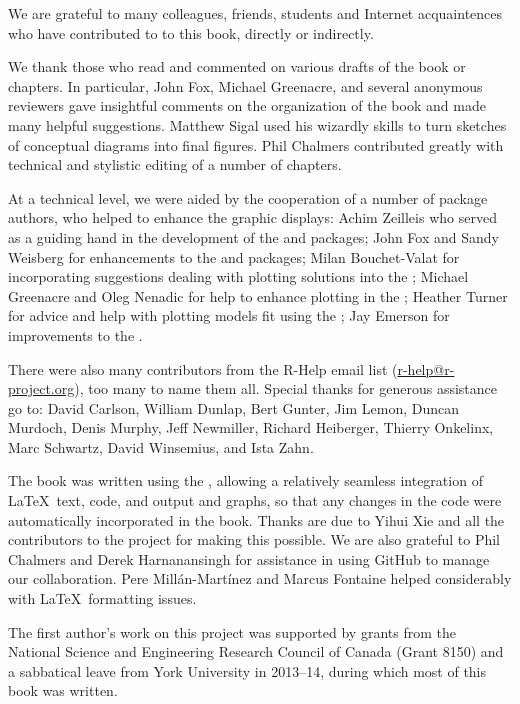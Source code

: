 We are grateful to many colleagues, friends, students and Internet acquaintences who have contributed to
to this book, directly or indirectly.

We thank those who read and commented on various drafts of the book or chapters.
In particular, John Fox, Michael Greenacre, and several anonymous reviewers gave
insightful comments on the organization of the book and made many helpful suggestions.
Matthew Sigal used his wizardly skills to turn sketches of conceptual diagrams into
final figures. Phil Chalmers contributed greatly with technical and stylistic editing
of a number of chapters.

At a technical level, we were aided by the cooperation of a number of \R package authors, who
helped to enhance the graphic displays:
Achim Zeilleis who served as a guiding hand in the development of the  and  packages;
John Fox and Sandy Weisberg for enhancements to the  and  packages;
Milan Bouchet-Valat for incorporating suggestions dealing with plotting  solutions into the ;
Michael Greenacre and Oleg Nenadic for help to enhance plotting in the ;
Heather Turner for advice and help with plotting models fit using the ;
Jay Emerson for improvements to the .

There were also many contributors from the R-Help email list (\url{r-help@r-project.org}), too many to name them all.
Special thanks for generous assistance go to:
David Carlson,
William Dunlap,
Bert Gunter,
Jim Lemon,
Duncan Murdoch,
Denis Murphy,
Jeff Newmiller,
Richard Heiberger,
Thierry Onkelinx,
Marc Schwartz,
David Winsemius, and
Ista Zahn.

The book was written using the , allowing a relatively seamless 
integration of \LaTeX\  text, \R code, and \R output and graphs, so that any changes
in the code were automatically incorporated in the book.
Thanks are due to Yihui Xie and all the contributors to the  project
for making this possible.  We are also grateful to Phil Chalmers and Derek Harnanansingh
for assistance in using GitHub to manage our collaboration.
 Pere Mill\'an-Mart\'inez and Marcus Fontaine helped considerably with \LaTeX\
formatting issues.

The first author's work on this project was supported by grants from the
National Science and Engineering Research Council of Canada (Grant 8150)
and a sabbatical leave from York University in 2013--14, during which most
of this book was written.

